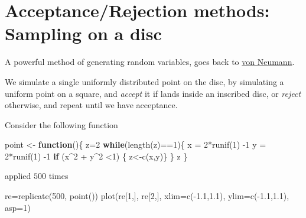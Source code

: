 \documentclass[
]{article}
\newenvironment{Shaded}{\begin{snugshade}}{\end{snugshade}}
\newcommand{\AttributeTok}[1]{\textcolor[rgb]{0.77,0.63,0.00}{#1}}
\newcommand{\ControlFlowTok}[1]{\textcolor[rgb]{0.13,0.29,0.53}{\textbf{#1}}}
\newcommand{\DecValTok}[1]{\textcolor[rgb]{0.00,0.00,0.81}{#1}}
\newcommand{\FloatTok}[1]{\textcolor[rgb]{0.00,0.00,0.81}{#1}}
\newcommand{\FunctionTok}[1]{\textcolor[rgb]{0.00,0.00,0.00}{#1}}
\newcommand{\NormalTok}[1]{#1}
\newcommand{\OtherTok}[1]{\textcolor[rgb]{0.56,0.35,0.01}{#1}}
\newcommand{\SpecialCharTok}[1]{\textcolor[rgb]{0.00,0.00,0.00}{#1}}
\theoremstyle{definition}
\theoremstyle{definition}
\theoremstyle{definition}
\theoremstyle{remark}
\begin{document}
\hypertarget{acceptancerejection-methods-sampling-on-a-disc}{%
\section{Acceptance/Rejection methods: Sampling on a disc}\label{acceptancerejection-methods-sampling-on-a-disc}}

A powerful method of generating random variables, goes back to \href{https://mcnp.lanl.gov/pdf_files/nbs_vonneumann.pdf}{von Neumann}.

We simulate a single uniformly distributed point on the disc, by simulating a uniform point on a square, and \emph{accept} it if lands inside an inscribed disc, or \emph{reject} otherwise, and repeat until we have acceptance.

Consider the following function

\begin{Shaded}
\begin{Highlighting}[]
\NormalTok{point }\OtherTok{\textless{}{-}} \ControlFlowTok{function}\NormalTok{()\{}
\NormalTok{  z}\OtherTok{=}\DecValTok{2}
  \ControlFlowTok{while}\NormalTok{(}\FunctionTok{length}\NormalTok{(z)}\SpecialCharTok{==}\DecValTok{1}\NormalTok{)\{}
\NormalTok{  x }\OtherTok{=} \DecValTok{2}\SpecialCharTok{*}\FunctionTok{runif}\NormalTok{(}\DecValTok{1}\NormalTok{) }\SpecialCharTok{{-}}\DecValTok{1}
\NormalTok{  y }\OtherTok{=} \DecValTok{2}\SpecialCharTok{*}\FunctionTok{runif}\NormalTok{(}\DecValTok{1}\NormalTok{) }\SpecialCharTok{{-}}\DecValTok{1}
\ControlFlowTok{if}\NormalTok{ (x}\SpecialCharTok{\^{}}\DecValTok{2} \SpecialCharTok{+}\NormalTok{ y}\SpecialCharTok{\^{}}\DecValTok{2} \SpecialCharTok{\textless{}}\DecValTok{1}\NormalTok{) \{ z}\OtherTok{\textless{}{-}}\FunctionTok{c}\NormalTok{(x,y)\}}
\NormalTok{  \}}
\NormalTok{  z}
\NormalTok{\}}
\end{Highlighting}
\end{Shaded}

applied \(500\) times

\begin{Shaded}
\begin{Highlighting}[]
\NormalTok{ re}\OtherTok{=}\FunctionTok{replicate}\NormalTok{(}\DecValTok{500}\NormalTok{, }\FunctionTok{point}\NormalTok{())}
 \FunctionTok{plot}\NormalTok{(re[}\DecValTok{1}\NormalTok{,], re[}\DecValTok{2}\NormalTok{,], }\AttributeTok{xlim=}\FunctionTok{c}\NormalTok{(}\SpecialCharTok{{-}}\FloatTok{1.1}\NormalTok{,}\FloatTok{1.1}\NormalTok{), }\AttributeTok{ylim=}\FunctionTok{c}\NormalTok{(}\SpecialCharTok{{-}}\FloatTok{1.1}\NormalTok{,}\FloatTok{1.1}\NormalTok{), }\AttributeTok{asp=}\DecValTok{1}\NormalTok{)}
\end{Highlighting}
\end{Shaded}
\end{document}
